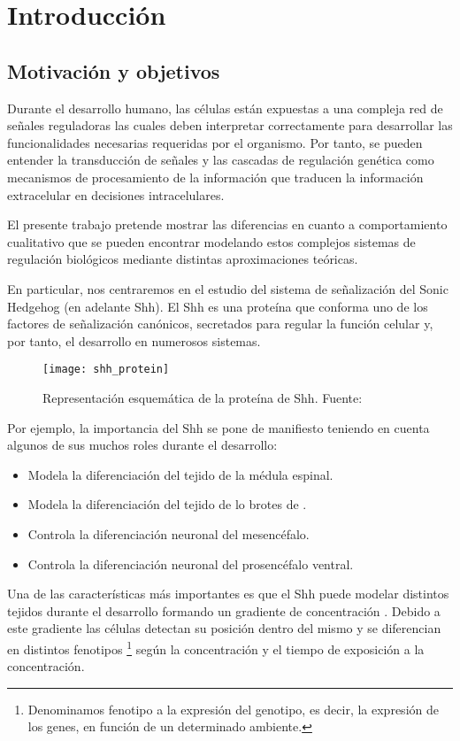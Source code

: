 \chapter{Introducción}

\section{ Motivación y objetivos}

Durante el desarrollo humano, las células están expuestas a una compleja red de señales reguladoras las cuales deben interpretar correctamente para desarrollar las funcionalidades necesarias requeridas por el organismo. Por tanto, se pueden entender la transducción de señales y las cascadas de regulación genética como mecanismos de procesamiento de la información que traducen la información extracelular en decisiones intracelulares.

El presente trabajo pretende mostrar las diferencias en cuanto a comportamiento cualitativo que se pueden encontrar modelando estos complejos sistemas de regulación biológicos mediante distintas aproximaciones teóricas. 

En particular, nos centraremos en el estudio del sistema de señalización del Sonic Hedgehog (en adelante Shh). 
El Shh es una proteína que conforma uno de los factores de señalización  canónicos, secretados
para regular la función celular y, por tanto, el desarrollo en numerosos sistemas.
\begin{figure}[h]
	\texttt{[image: shh\_protein]}
	\centering
	\caption{Representación esquemática de la proteína de Shh. Fuente: \cite{wiki:foto_shh}}
\end{figure}


Por ejemplo, la importancia del Shh se pone de manifiesto teniendo en cuenta algunos de sus muchos roles durante el desarrollo: 
\begin{itemize}
	\item Modela la diferenciación del tejido de la médula espinal.
	\item Modela la diferenciación del tejido de lo brotes de .
	\item Controla la diferenciación neuronal del mesencéfalo. 
	\item Controla la diferenciación neuronal del prosencéfalo ventral.
\end{itemize}

Una de las características más importantes es que el Shh puede modelar distintos tejidos durante el desarrollo formando un gradiente de concentración \cite{saha}. Debido a este gradiente las células detectan su posición dentro del mismo y se diferencian en distintos fenotipos \footnote{Denominamos fenotipo a la expresión del genotipo, es decir, la expresión de los genes, en función de un determinado ambiente.} según la concentración y el tiempo de exposición a la concentración.

